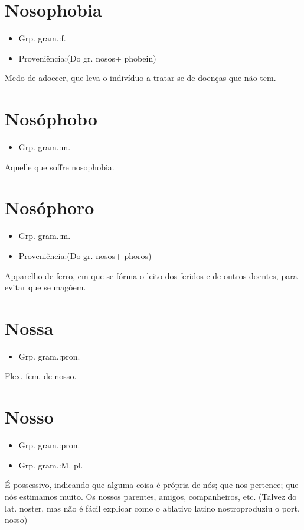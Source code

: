 \section{Nosophobia}
\begin{itemize}
\item {Grp. gram.:f.}
\end{itemize}
\begin{itemize}
\item {Proveniência:(Do gr. \textunderscore nosos\textunderscore  + \textunderscore phobein\textunderscore )}
\end{itemize}
Medo de adoecer, que leva o indivíduo a tratar-se de doenças que não tem.
\section{Nosóphobo}
\begin{itemize}
\item {Grp. gram.:m.}
\end{itemize}
Aquelle que soffre nosophobia.
\section{Nosóphoro}
\begin{itemize}
\item {Grp. gram.:m.}
\end{itemize}
\begin{itemize}
\item {Proveniência:(Do gr. \textunderscore nosos\textunderscore  + \textunderscore phoros\textunderscore )}
\end{itemize}
Apparelho de ferro, em que se fórma o leito dos feridos e de outros doentes, para evitar que se magôem.
\section{Nossa}
\begin{itemize}
\item {Grp. gram.:pron.}
\end{itemize}
Flex. fem. de \textunderscore nosso\textunderscore .
\section{Nosso}
\begin{itemize}
\item {Grp. gram.:pron.}
\end{itemize}
\begin{itemize}
\item {Grp. gram.:M. pl.}
\end{itemize}
É possessivo, indicando que alguma coisa é própria de nós; que nos pertence; que nós estimamos muito.
Os nossos parentes, amigos, companheiros, etc.
(Talvez do lat. \textunderscore noster\textunderscore , mas não é fácil explicar como o ablativo latino \textunderscore nostro\textunderscore  produziu o port. \textunderscore nosso\textunderscore )
